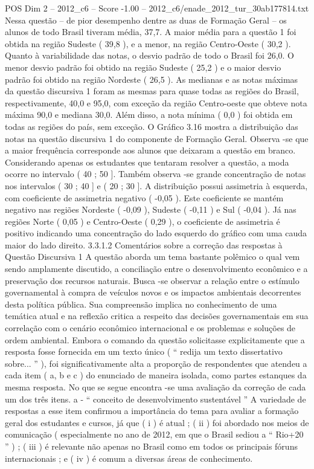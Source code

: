 \begin{textsample}{POS Dim 2 – 2012\_c6 – Score -1.00 – 2012\_c6/enade\_2012\_tur\_30ab177814.txt}
Nessa questão – de pior desempenho dentre as duas de Formação Geral – os alunos de todo Brasil tiveram média, 37,7.
A maior média para a questão 1 foi obtida na região Sudeste ( 39,8 ), e a menor, na região Centro-Oeste ( 30,2 ).
Quanto à variabilidade das notas, o desvio padrão de todo o Brasil foi 26,0.
O menor desvio padrão foi obtido na região Sudeste ( 25,2 ) e o maior desvio padrão foi obtido na região Nordeste ( 26,5 ).
As medianas e as notas máximas da questão discursiva 1 foram as mesmas para quase todas as regiões do Brasil, respectivamente, 40,0 e 95,0, com exceção da região Centro-oeste que obteve nota máxima 90,0 e mediana 30,0.
Além disso, a nota mínima ( 0,0 ) foi obtida em todas as regiões do país, sem exceção.
O Gráfico 3.16 mostra a distribuição das notas na questão discursiva 1 do componente de Formação Geral.
Observa -se que a maior frequência corresponde aos alunos que deixaram a questão em branco.
Considerando apenas os estudantes que tentaram resolver a questão, a moda ocorre no intervalo ( 40 ; 50 ].
Também observa -se grande concentração de notas nos intervalos ( 30 ; 40 ] e ( 20 ; 30 ].
A distribuição possui assimetria à esquerda, com coeficiente de assimetria negativo ( -0,05 ).
Este coeficiente se mantém negativo nas regiões Nordeste ( -0,09 ), Sudeste ( -0,11 ) e Sul ( -0,04 ).
Já nas regiões Norte ( 0,05 ) e Centro-Oeste ( 0,29 ), o coeficiente de assimetria é positivo indicando uma concentração do lado esquerdo do gráfico com uma cauda maior do lado direito. 3.3.1.2 Comentários sobre a correção das respostas à Questão Discursiva 1 A questão aborda um tema bastante polêmico o qual vem sendo amplamente discutido, a conciliação entre o desenvolvimento econômico e a preservação dos recursos naturais.
Busca -se observar a relação entre o estímulo governamental à compra de veículos novos e os impactos ambientais decorrentes desta política pública.
Sua compreensão implica no conhecimento de uma temática atual e na reflexão critica a respeito das decisões governamentais em sua correlação com o cenário econômico internacional e os problemas e soluções de ordem ambiental.
Embora o comando da questão solicitasse explicitamente que a resposta fosse fornecida em um texto único ( “ redija um texto dissertativo sobre... ” ), foi significativamente alta a proporção de respondentes que atendeu a cada item ( a, b e c ) do enunciado de maneira isolada, como partes estanques da mesma resposta.
No que se segue encontra -se uma avaliação da correção de cada um dos três itens. a - “ conceito de desenvolvimento sustentável ” A variedade de respostas a esse item confirmou a importância do tema para avaliar a formação geral dos estudantes e cursos, já que ( i ) é atual ; ( ii ) foi abordado nos meios de comunicação ( especialmente no ano de 2012, em que o Brasil sediou a “ Rio+20 ” ) ; ( iii ) é relevante não apenas no Brasil como em todos os principais fóruns internacionais ; e ( iv ) é comum a diversas áreas de conhecimento.

\end{textsample}
